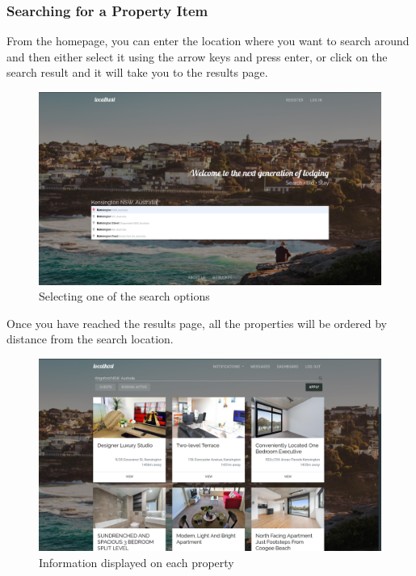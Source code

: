 \subsubsection{Searching for a Property Item}
From the homepage, you can enter the location where you want to search around
and then either select it using the arrow keys and press enter, or click on the
search result and it will take you to the results page.

\begin{figure}[!h]
  \includegraphics[width=\linewidth]{assets/userManual/searchOption.png}
  \caption{Selecting one of the search options}
  \label{fig:searchOption}
\end{figure}

Once you have reached the results page, all the properties will be ordered by
distance from the search location. 

\begin{figure}[!h]
  \includegraphics[width=\linewidth]{assets/userManual/searchResults.png}
  \caption{Information displayed on each property}
  \label{fig:searchResults}
\end{figure}

